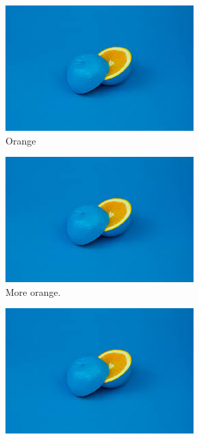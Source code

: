 \documentclass{article}
\begin{document}
	\begin{figure}[h!]
		\centering
		\begin{subfigure}[b]{0.2\linewidth}
			\includegraphics[width=\linewidth]{orange.jpg}
			\caption{Orange}
		\end{subfigure}
		\begin{subfigure}[b]{0.2\linewidth}
			\includegraphics[width=\linewidth]{orange.jpg}
			\caption{More orange.}
		\end{subfigure}
	\begin{subfigure}[b]{0.2\linewidth}
		\includegraphics[width=\linewidth]{orange.jpg}

\end{subfigure}
\end{figure}
\end{document}
